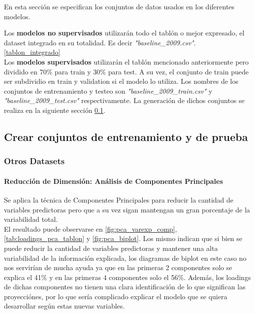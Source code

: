 
En esta sección se especifican los conjuntos de datos usados en los diferentes modelos.

Los \textbf{modelos no supervisados} utilizarán todo el tablón o mejor expresado, el dataset integrado en su totalidad. Es decir \textit{"baseline\_2009.csv"}. \ref{tablon_integrado} \\

Los \textbf{modelos supervisados} utilizarán el tablón mencionado anteriormente pero dividido en 70\% para train y 30\% para test. A su vez, el conjunto de train puede ser subdividio en train y validation si el modelo lo utiliza.
Los nombres de los conjuntos de entrenamiento y testeo son \textit{"baseline\_2009\_train.csv"} y \textit{"baseline\_2009\_test.csv"} respectivamente.
La generación de dichos conjuntos se realiza en la siguiente sección \ref{dataset_train_test}.

\subsection{Crear conjuntos de entrenamiento y de prueba}\label{dataset_train_test}






\subsubsection{Otros Datasets}

\paragraph{Reducción de Dimensión: Análisis de Componentes Principales}\label{anuxe1lisis-de-componentes-principales}

Se aplica la técnica de Componentes Principales para reducir la cantidad de variables predictoras pero que a su vez sigan mantengan un gran porcentaje de la variabilidad total.\\
El resultado puede observarse en \ref{fig:pca_varexp_comp}, \ref{tab:loadings_pca_tablon} y \ref{fig:pca_biplot}. Los mismo indican que si bien se puede reducir la cantidad de variables
predictoras y mantener una alta variabilidad de la información
explicada, los diagramas de biplot en este caso no nos servirían de
mucha ayuda ya que en las primeras 2 componentes solo se explica el 41\%
y en las primeras 4 componentes solo el 56\%. Además, los loadings de
dichas componentes no tienen una clara identificación de lo que significan las proyecciónes, por lo que sería complicado explicar el modelo que se quiera desarrollar según estas nuevas variables.

